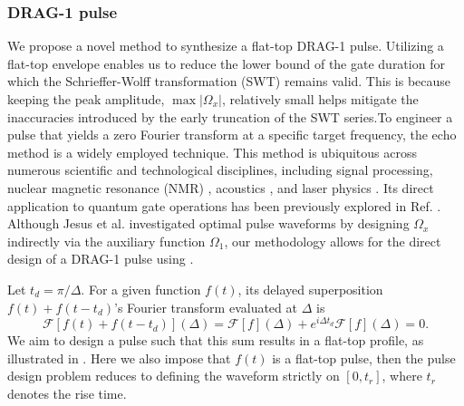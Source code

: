 \subsubsection{DRAG-1 pulse}
\label{subsubsec:drag1_method}
We propose a novel method to synthesize a flat-top DRAG-1 pulse. Utilizing a flat-top envelope enables us to reduce the
lower bound of the gate duration for which the Schrieffer-Wolff transformation (SWT) remains valid. This is because
keeping the peak amplitude, $\max\vert{}\Omega_x\vert{}$, relatively small helps mitigate the inaccuracies introduced by
the early truncation of the SWT series.To engineer a pulse that yields a zero Fourier transform at a specific target
frequency, the echo method is a widely employed technique. This method is ubiquitous across numerous scientific and
technological disciplines, including signal processing, nuclear magnetic resonance (NMR) \cite{Jenkins}, acoustics
\cite{Pal2018}, and laser physics \cite{Ma2021}. Its direct application to quantum gate operations has been previously
explored in Ref. \cite{Polat2026}.
Although Jesus et al. \cite{99999} investigated optimal pulse waveforms by designing
$\Omega_x$ indirectly via the auxiliary function $\Omega_1$, our methodology allows for the direct design of a DRAG-1
pulse using .



Let $t_d=\pi/\Delta$. For a given function $f(t)$, its delayed superposition $f(t)+f(t-t_d)$'s Fourier transform evaluated at $\Delta$ is
$$
  \mathcal{F}[f(t)+f(t-t_d)](\Delta) = \mathcal{F}[f](\Delta)+e^{i\Delta t_d}\mathcal{F}[f](\Delta) = 0.
$$
We aim to design a pulse such that this sum results in a flat-top profile, as illustrated in .
Here we also impose that $f(t)$ is a flat-top pulse, then the pulse design problem reduces to defining the waveform
strictly on $[0,t_r]$, where $t_r$ denotes the rise time.

